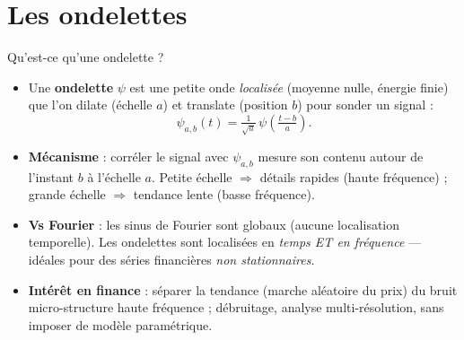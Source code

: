 \documentclass[10pt,aspectratio=169]{beamer}
\begin{document}
\section{Les ondelettes}
\begin{frame}{Qu'est-ce qu'une ondelette ?}
  \begin{itemize}\setlength{\itemsep}{4pt}
    \item Une \textbf{ondelette} $\psi$ est une petite onde \emph{localisée}
          (moyenne nulle, énergie finie) que l'on dilate (échelle $a$) et
          translate (position $b$) pour sonder un signal :
          \[ \psi_{a,b}(t) = \tfrac{1}{\sqrt{a}}\,\psi\!\left(\tfrac{t-b}{a}\right). \]
    \item \textbf{Mécanisme} : corréler le signal avec $\psi_{a,b}$ mesure
          son contenu autour de l'instant $b$ à l'échelle $a$. Petite échelle
          $\Rightarrow$ détails rapides (haute fréquence) ; grande échelle
          $\Rightarrow$ tendance lente (basse fréquence).
    \item \textbf{Vs Fourier} : les sinus de Fourier sont globaux (aucune
          localisation temporelle). Les ondelettes sont localisées en
          \emph{temps ET en fréquence} --- idéales pour des séries
          financières \emph{non stationnaires}.
    \item \textbf{Intérêt en finance} : séparer la tendance (marche aléatoire
          du prix) du bruit micro-structure haute fréquence ; débruitage,
          analyse multi-résolution, sans imposer de modèle paramétrique.
  \end{itemize}
\end{frame}
\end{document}
